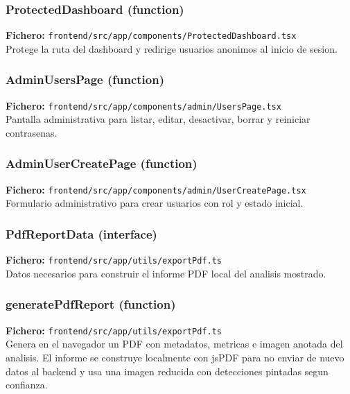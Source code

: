 \subsubsection*{ProtectedDashboard (function)}
\noindent\textbf{Fichero:} \texttt{frontend/src/app/components/ProtectedDashboard.tsx}\\
Protege la ruta del dashboard y redirige usuarios anonimos al inicio de sesion.


\subsubsection*{AdminUsersPage (function)}
\noindent\textbf{Fichero:} \texttt{frontend/src/app/components/admin/UsersPage.tsx}\\
Pantalla administrativa para listar, editar, desactivar, borrar y reiniciar contrasenas.


\subsubsection*{AdminUserCreatePage (function)}
\noindent\textbf{Fichero:} \texttt{frontend/src/app/components/admin/UserCreatePage.tsx}\\
Formulario administrativo para crear usuarios con rol y estado inicial.


\subsubsection*{PdfReportData (interface)}
\noindent\textbf{Fichero:} \texttt{frontend/src/app/utils/exportPdf.ts}\\
Datos necesarios para construir el informe PDF local del analisis mostrado.


\subsubsection*{generatePdfReport (function)}
\noindent\textbf{Fichero:} \texttt{frontend/src/app/utils/exportPdf.ts}\\
Genera en el navegador un PDF con metadatos, metricas e imagen anotada del analisis. El informe se construye localmente con jsPDF para no enviar de nuevo datos al backend y usa una imagen reducida con detecciones pintadas segun confianza.


